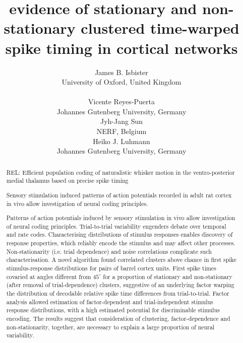 \documentclass{article}
\title{evidence of stationary and non-stationary clustered time-warped spike timing in cortical networks}
\author{
  James B. Isbister\\
  University of Oxford, United Kingdom
  \And
              \\
              \\
  \And
  Vicente Reyes-Puerta\\
  Johannes Gutenberg University, Germany
  

  \And
  Jyh-Jang Sun\\
  NERF, Belgium

  \And
  Heiko J. Luhmann\\
  Johannes Gutenberg University, Germany


}
\begin{document}
\maketitle
 
\begin{abstract}

REL: Efficient population coding of naturalistic whisker motion in the ventro-posterior medial thalamus based on precise spike timing

Sensory stimulation induced patterns of action potentials recorded in adult rat cortex in vivo allow investigation of neural coding principles. 

Patterns of action potentials induced by sensory stimulation in vivo allow investigation of neural coding principles. Trial-to-trial variability engenders debate over temporal and rate codes. Characterising distributions of stimulus responses enables discovery of response properties, which reliably encode the stimulus and may affect other processes. Non-stationarity (i.e. trial dependence) and noise correlations complicate such characterisation. A novel algorithm found correlated clusters above chance in first spike stimulus-response distributions for pairs of barrel cortex units. First spike times covaried at angles different from $45^{\circ}$ for a proportion of stationary and non-stationary (after removal of trial-dependence) clusters, suggestive of an underlying factor warping the distribution of decodable relative spike time differences from trial-to-trial. Factor analysis allowed estimation of factor-dependent and trial-independent stimulus response distributions, with a high estimated potential for discriminable stimulus encoding. The results suggest that consideration of clustering, factor-dependence and non-stationarity, together, are necessary to explain a large proportion of neural variability.


\end{abstract}


\end{document}
